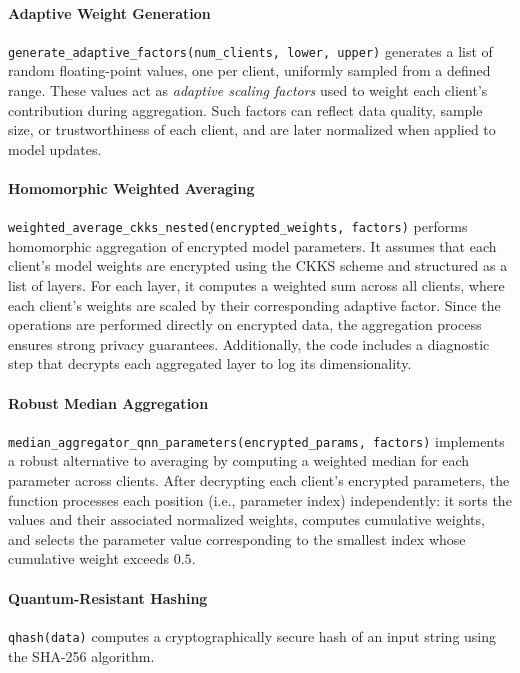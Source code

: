 \documentclass[10pt]{article}
\begin{document}
\paragraph{Adaptive Weight Generation}
\texttt{generate\_adaptive\_factors(num\_clients, lower, upper)} generates a list of random floating-point values, one per client, uniformly sampled from a defined range. These values act as \textit{adaptive scaling factors} used to weight each client's contribution during aggregation. Such factors can reflect data quality, sample size, or trustworthiness of each client, and are later normalized when applied to model updates.
\paragraph{Homomorphic Weighted Averaging}
\texttt{weighted\_average\_ckks\_nested(encrypted\_weights, factors)} performs homomorphic aggregation of encrypted model parameters. It assumes that each client's model weights are encrypted using the CKKS scheme and structured as a list of layers. For each layer, it computes a weighted sum across all clients, where each client's weights are scaled by their corresponding adaptive factor. Since the operations are performed directly on encrypted data, the aggregation process ensures strong privacy guarantees. Additionally, the code includes a diagnostic step that decrypts each aggregated layer to log its dimensionality.
\paragraph{Robust Median Aggregation}
\texttt{median\_aggregator\_qnn\_parameters(encrypted\_params, factors)} implements a robust alternative to averaging by computing a weighted median for each parameter across clients. After decrypting each client’s encrypted parameters, the function processes each position (i.e., parameter index) independently: it sorts the values and their associated normalized weights, computes cumulative weights, and selects the parameter value corresponding to the smallest index whose cumulative weight exceeds $0.5$.
\paragraph{Quantum-Resistant Hashing}
\texttt{qhash(data)} computes a cryptographically secure hash of an input string using the SHA-256 algorithm.
\end{document}
